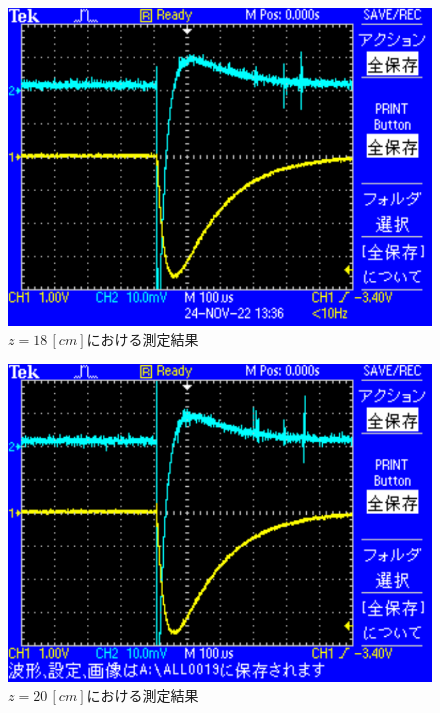 \begin{figure}[H]
    \centering
    \includegraphics[scale=0.5]{images-10.pdf}
    \caption{$z=18\,[cm]$における測定結果}
\end{figure}

\begin{figure}[H]
    \centering
    \includegraphics[scale=0.5]{images-11.pdf}
    \caption{$z=20\,[cm]$における測定結果}
\end{figure}

